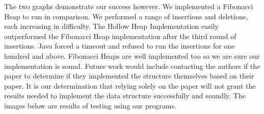 \documentclass[letter,10pt]{article}
\begin{document}
\quad The two graphs demonstrate our success however. We implemented a Fibonacci Heap to run in comparison. We performed a range of insertions and deletions, each increasing in difficulty. The Hollow Heap Implementation easily outperformed the Fibonacci Heap implementation after the third round of insertions. Java forced a timeout and refused to run the insertions for one hundred and above. Fibonacci Heaps are well implemented too so we are sure our implementation is sound. Future work would include contacting the authors if the paper to determine if they implemented the structure themselves based on their paper. It is our determination that relying solely on the paper will not grant the results needed to implement the data structure successfully and soundly. The images below are results of testing using our programs. 
\end{document}
